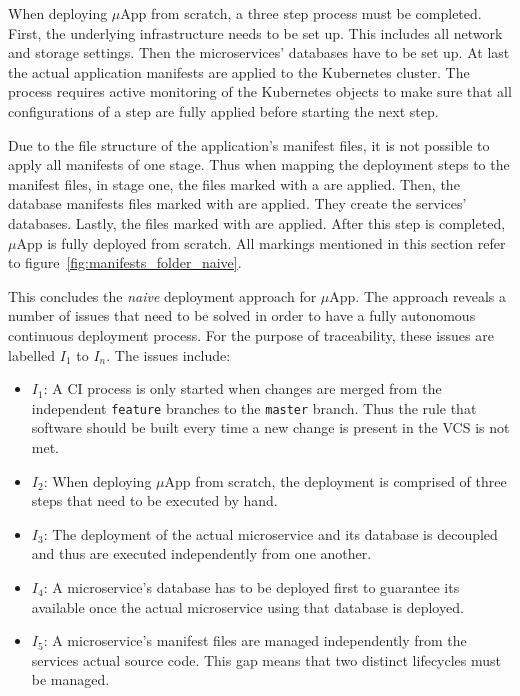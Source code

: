When deploying $\mu$App from scratch, a three step process must be completed.
First, the underlying infrastructure needs to be set up. This includes all
network and storage settings. Then the microservices' databases have to be set
up. At last the actual application manifests are applied to the Kubernetes
cluster. The process requires active monitoring of the Kubernetes objects to
make sure that all configurations of a step are fully applied before starting
the next step.

Due to the file structure of the application's manifest files, it is not
possible to apply all manifests of one stage. Thus when mapping the deployment
steps to the manifest files, in stage one, the files marked with a
\inlineDiamond{} are applied. Then, the database manifests files marked with
\inlineRectangle{} are applied. They create the services' databases. Lastly,
the files marked with \inlineTriangle{} are applied. After this step is
completed, $\mu$App is fully deployed from scratch. All markings mentioned in
this section refer to figure~\ref{fig:manifests_folder_naive}.

This concludes the \textit{naive} deployment approach for $\mu$App. The
approach reveals a number of issues that need to be solved in order to have a
fully autonomous continuous deployment process. For the purpose of
traceability, these issues are labelled $I_1$ to $I_n$. The issues include:

\begin{itemize}
  \item \textit{$I_1$}: A \ac{CI} process is only started when changes are
    merged from the independent \texttt{feature} branches to the
    \texttt{master} branch. Thus the rule that software should be built every
    time a new change is present in the \ac{VCS} is not met.
  \item \textit{$I_2$}: When deploying $\mu$App from scratch, the deployment is
    comprised of three steps that need to be executed by hand.
  \item \textit{$I_3$}: The deployment of the actual microservice and its
    database is decoupled and thus are executed independently from one another.
  \item \textit{$I_4$}: A microservice's database has to be deployed first to
    guarantee its available once the actual microservice using that database is
    deployed.
  \item \textit{$I_5$}: A microservice's manifest files are managed
    independently from the services actual source code. This gap means that two
    distinct lifecycles must be managed.
\end{itemize}


